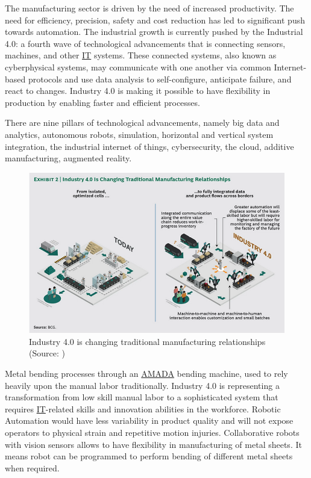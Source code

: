The manufacturing sector is driven by the need of increased productivity. The need
for efficiency, precision, safety and cost reduction has led to significant push towards
automation. The industrial growth is currently pushed by the Industrial 4.0: a fourth wave
of technological advancements that is connecting sensors, machines, and other
\hyperref[acro:IT]{IT} systems. These connected systems, also known as cyberphysical systems, may communicate with one 
another via common Internet-based protocols and use data analysis to self-configure, anticipate 
failure, and react to changes. Industry 4.0 is making it possible to have
flexibility in production by enabling faster and efficient processes. \cite{BAI2020107776,russmann2015industry}

There are nine pillars of technological advancements, namely big data and analytics, autonomous robots, simulation,
horizontal and vertical system integration, the industrial internet of things,
cybersecurity, the cloud, additive manufacturing, augmented reality. \cite{russmann2015industry}


\begin{figure}[h]
    \centering
    \includegraphics[width=\textwidth]{1. Introduction/1.1 Background/exhibit2.png}
    \caption{Industry 4.0 is changing traditional manufacturing relationships (Source: \cite{russmann2015industry})}
    \label{fig:background-exhibit-2}
\end{figure}

Metal bending processes through an \hyperref[acro:AMADA]{AMADA} bending machine, used to rely heavily upon the
manual labor traditionally. Industry 4.0 is representing a transformation
from low skill manual labor to a sophisticated system that requires \hyperref[acro:IT]{IT}-related skills
and innovation abilities in the workforce. Robotic Automation would have less variability in product
quality and will not expose operators to physical strain and repetitive motion injuries. Collaborative robots
with vision sensors \cite{8361333} allows to have flexibility in manufacturing of metal sheets.
It means robot can be programmed to perform bending of different metal sheets when required. \cite{kassowrobotsblog}
